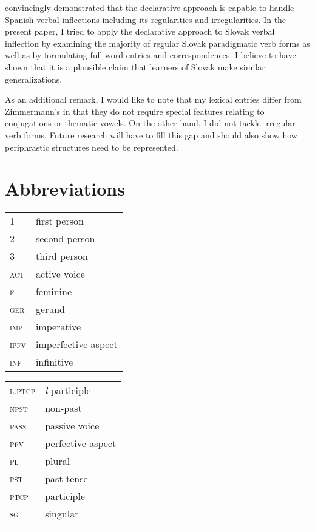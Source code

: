 \documentclass[output=paper,colorlinks,citecolor=brown]{langscibook}
\begin{document}
\citet{Zimmermann2019} convincingly demonstrated that the declarative approach is capable to handle Spanish verbal inflections including its regularities and irregularities. In the present paper, I tried to apply the declarative approach to Slovak verbal inflection by examining the majority of regular Slovak paradigmatic verb forms as well as by formulating full word entries and correspondences. I believe to have shown that it is a plausible claim that learners of Slovak make similar generalizations. 

\largerpage[1] %

As an additional remark, I would like to note that my lexical entries differ from Zimmermann's in that they do not require special features relating to conjugations or thematic vowels. On the other hand, I did not tackle irregular verb forms. Future research will have to fill this gap and should also show how periphrastic structures need to be represented.

\section*{Abbreviations}
\begin{tabularx}{.5\textwidth}{@{}lQ}
\textsc{1} & first person \\
\textsc{2} & second person \\
\textsc{3} & third person \\
\textsc{act} & active voice \\
\textsc{f} & feminine \\
\textsc{ger} & gerund \\
\textsc{imp} & imperative \\
\textsc{ipfv} & imperfective aspect \\
\textsc{inf} & infinitive \\
\end{tabularx}%
\begin{tabularx}{.5\textwidth}{lQ@{}}
\textsc{l.ptcp} & \textit{l}-participle \\
\textsc{npst} & non-past\\
\textsc{pass} & passive voice \\
\textsc{pfv} & perfective aspect \\
\textsc{pl} & plural \\
\textsc{pst} & past tense \\
\textsc{ptcp} & participle \\
\textsc{sg} & singular \\
& \\
\end{tabularx}
\end{document}
